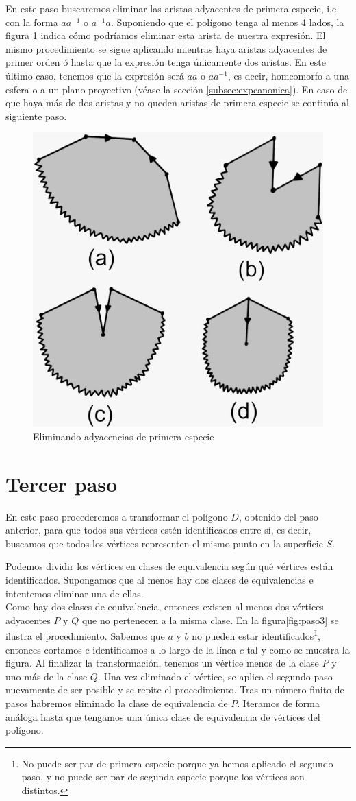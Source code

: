 \documentclass[a4paper,11pt,spanish, twoside, leqno]{tfg-uam}
\theoremstyle{definition}
\begin{document}
En este paso buscaremos eliminar las aristas adyacentes de primera especie, i.e, con la forma $aa^{-1}$ o $a^{-1}a$. Suponiendo que el polígono tenga al menos 4 lados, la figura \ref{fig:paso2} indica cómo podríamos eliminar esta arista de nuestra expresión. El mismo procedimiento se sigue aplicando mientras haya aristas adyacentes de primer orden ó hasta que la expresión tenga únicamente dos aristas. En este último caso, tenemos que la expresión será $aa$ o $aa^{-1}$, es decir, homeomorfo a una esfera o a un plano proyectivo (véase la sección \ref{subsec:expcanonica}). En caso de que haya más de dos aristas y no queden aristas de primera especie se continúa al siguiente paso.
\begin{figure}[h!]
	\centering
	\includegraphics[width=0.4\linewidth]{imagenes/paso2.jpeg}
	\caption{Eliminando adyacencias de primera especie}
	\label{fig:paso2}
\end{figure}

\section{Tercer paso}

En este paso procederemos a transformar el polígono $D$, obtenido del paso anterior, para que todos sus vértices estén identificados entre sí, es decir, buscamos que todos los vértices representen el mismo punto en la superficie $S$. 

Podemos dividir los vértices en clases de equivalencia según qué vértices están identificados. Supongamos que al menos hay dos clases de equivalencias e intentemos eliminar una de ellas.\\
Como hay dos clases de equivalencia, entonces existen al menos dos vértices adyacentes $P$ y $Q$ que no pertenecen a la misma clase. En la figura\ref{fig:paso3} se ilustra el procedimiento. Sabemos que $a$ y $b$ no pueden estar identificados\footnote{No puede ser par de primera especie porque ya hemos aplicado el segundo paso, y no puede ser par de segunda especie porque los vértices son distintos.}, entonces cortamos e identificamos a lo largo de la línea $c$ tal y como  se muestra la figura. Al finalizar la transformación, tenemos un vértice menos de la clase $P$ y uno más de la clase $Q$. Una vez eliminado el vértice, se aplica el segundo paso nuevamente de ser posible y se repite el procedimiento. Tras un número finito de pasos habremos eliminado la clase de equivalencia de $P$. Iteramos de forma análoga hasta que tengamos una única clase de equivalencia de vértices del polígono.
\end{document}
